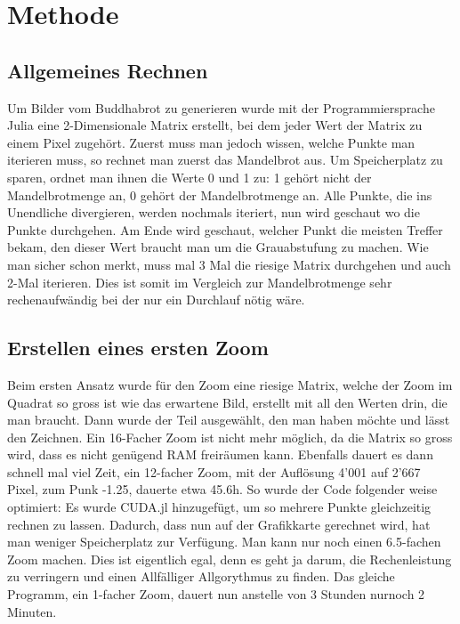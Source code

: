 \section{Methode}
\subsection{Allgemeines Rechnen}
Um Bilder vom Buddhabrot zu generieren wurde mit der Programmiersprache Julia eine 2-Dimensionale Matrix erstellt, bei dem jeder Wert der Matrix zu einem Pixel zugehört. Zuerst muss man jedoch wissen, welche Punkte man iterieren muss, so rechnet man zuerst das Mandelbrot aus. Um Speicherplatz zu sparen, ordnet man ihnen die Werte 0 und 1 zu: 1 gehört nicht der Mandelbrotmenge an, 0 gehört der Mandelbrotmenge an. Alle Punkte, die ins Unendliche divergieren, werden nochmals iteriert, nun wird geschaut wo die Punkte durchgehen. Am Ende wird geschaut, welcher Punkt die meisten Treffer bekam, den dieser Wert braucht man um die Grauabstufung zu machen. Wie man sicher schon merkt, muss mal 3 Mal die riesige Matrix durchgehen und auch 2-Mal iterieren. Dies ist somit im Vergleich zur Mandelbrotmenge sehr rechenaufwändig bei der nur ein Durchlauf nötig wäre.
\subsection{Erstellen eines ersten Zoom}
Beim ersten Ansatz wurde für den Zoom eine riesige Matrix, welche der Zoom im Quadrat so gross ist wie das erwartene Bild, erstellt mit all den Werten drin, die man braucht. Dann wurde der Teil ausgewählt, den man haben möchte und lässt den Zeichnen. Ein 16-Facher Zoom ist nicht mehr möglich, da die Matrix so gross wird, dass es nicht genügend RAM freiräumen kann. Ebenfalls dauert es dann schnell mal viel Zeit, ein 12-facher Zoom, mit der Auflösung 4'001 auf 2'667 Pixel, zum Punk -1.25, dauerte etwa 45.6h. So wurde der Code folgender weise optimiert: Es wurde CUDA.jl hinzugefügt, um so mehrere Punkte gleichzeitig rechnen zu lassen. Dadurch, dass nun auf der Grafikkarte gerechnet wird, hat man weniger Speicherplatz zur Verfügung. Man kann nur noch einen 6.5-fachen Zoom machen. Dies ist eigentlich egal, denn es geht ja darum, die Rechenleistung zu verringern und einen Allfälliger Allgorythmus zu finden. Das gleiche Programm, ein 1-facher Zoom, dauert nun anstelle von 3 Stunden nurnoch 2 Minuten.
